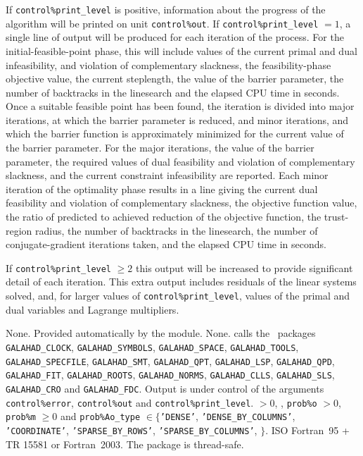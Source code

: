 \documentclass{galahad}
\newcommand{\packagename}{SLLSB}
\begin{document}

\galinfo
If {\tt control\%print\_level} is positive, information about the progress
of the algorithm will be printed on unit {\tt control\-\%out}.
If {\tt control\%print\_level} $= 1$, a single line of output will be produced
for each iteration of the process.
For the initial-feasible-point phase,
this will include values of the current primal and dual infeasibility, and
violation of complementary slackness, the feasibility-phase objective value,
the current steplength, the value of the barrier parameter, the
number of backtracks in the linesearch and the elapsed CPU time in seconds.
Once a suitable feasible point has been found, the iteration is divided
into major iterations, at which the barrier parameter is reduced, and
minor iterations, and which the barrier function is approximately minimized
for the current value of the barrier parameter. For the major iterations,
the value of the barrier parameter, the required values of
dual feasibility and violation of complementary slackness, and the current
constraint infeasibility are reported. Each minor iteration of the
optimality phase results in a line giving
the current dual feasibility and violation of complementary slackness, the
objective function value, the ratio of predicted to achieved reduction
of the objective function, the trust-region radius, the
number of backtracks in the linesearch, the number of conjugate-gradient
iterations taken, and the elapsed CPU time in seconds.

If {\tt control\%print\_level} $\geq 2$ this
output will be increased to provide significant detail of each iteration.
This extra output includes residuals of the linear systems solved, and,
for larger values of {\tt control\%print\_level}, values of the primal and dual
variables and Lagrange multipliers.


\galgeneral

\galcommon None.
\galworkspace Provided automatically by the module.
\galroutines None.
\galmodules {\tt \packagename\_solve} calls the \galahad\ packages
{\tt GALAHAD\_CLOCK},
{\tt GALAHAD\_SY\-M\-BOLS},
{\tt GALA\-HAD\_SPACE},
{\tt GAL\-AHAD\_TOOLS},
{\tt GALAHAD\_SPECFILE},
{\tt GALAHAD\_SMT},
{\tt GALAHAD\_QPT},
{\tt GALAHAD\_LSP},
{\tt GALAHAD\_QPD},
{\tt GALAHAD\_FIT},
{\tt GALAHAD\_ROOTS},
{\tt GALAHAD\_NORMS},
{\tt GALAHAD\_CLLS},
{\tt GALAHAD\_SLS},
{\tt GALAHAD\_CRO}
and
{\tt GAL\-AHAD\_FDC}.
\galio Output is under control of the arguments
 {\tt control\%error}, {\tt control\%out} and {\tt control\%print\_level}.
 $> 0$, , {\tt prob\%o} $> 0$,
{\tt prob\%m} $\geq  0$ and
{\tt prob\%Ao\_type} $\in \{${\tt 'DENSE'},
 {\tt 'DENSE\_BY\_COLUMNS'},  {\tt 'COORDINATE'},
{\tt 'SPARSE\_BY\_\-ROWS'}, {\tt 'SPARSE\_BY\_\-COLUMNS'},
$\}$.
\galportability ISO Fortran~95 + TR 15581 or Fortran~2003.
The package is thread-safe.
\end{document}
